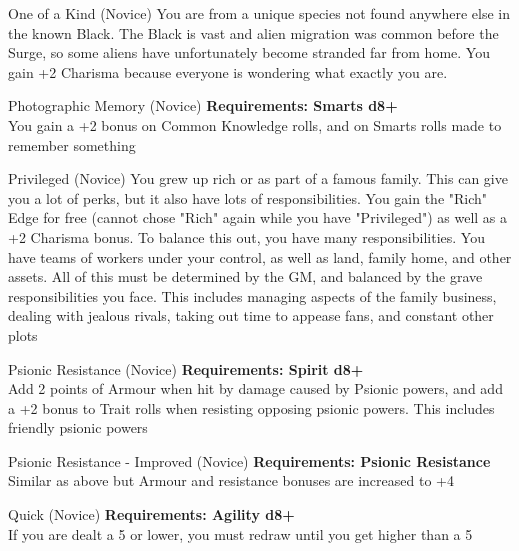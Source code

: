 \begin{multicols}{2}
\begin{genericsection}{One of a Kind (Novice)}
You are from a unique species not found anywhere else in the known Black. The Black is vast and alien migration was common before the Surge, so some aliens have unfortunately become stranded far from home. You gain +2 Charisma because everyone is wondering what exactly you are.
\end{genericsection}

\begin{genericsection}{Photographic Memory (Novice)}
\textbf{Requirements: Smarts d8+}\\
You gain a +2 bonus on Common Knowledge rolls, and on Smarts rolls made to remember something
\end{genericsection}

\begin{genericsection}{Privileged (Novice)}
You grew up rich or as part of a famous family. This can give you a lot of perks, but it also have lots of responsibilities. You gain the "Rich" Edge for free (cannot chose "Rich" again while you have "Privileged") as well as a +2 Charisma bonus. To balance this out, you have many responsibilities. You have teams of workers under your control, as well as land, family home, and other assets. All of this must be determined by the GM, and balanced by the grave responsibilities you face. This includes managing aspects of the family business, dealing with jealous rivals, taking out time to appease fans, and constant other plots
\end{genericsection}

\begin{genericsection}{Psionic Resistance (Novice)}
\textbf{Requirements: Spirit d8+}\\
Add 2 points of Armour when hit by damage caused by Psionic powers, and add a +2 bonus to Trait rolls when resisting opposing psionic powers. This includes friendly psionic powers
\end{genericsection}

\begin{genericsection}{Psionic Resistance - Improved (Novice)}
\textbf{Requirements: Psionic Resistance}\\
Similar as above but Armour and resistance bonuses are increased to +4
\end{genericsection}

\begin{genericsection}{Quick (Novice)}
\textbf{Requirements: Agility d8+}\\
If you are dealt a 5 or lower, you must redraw until you get higher than a 5
\end{genericsection}


\end{multicols}

